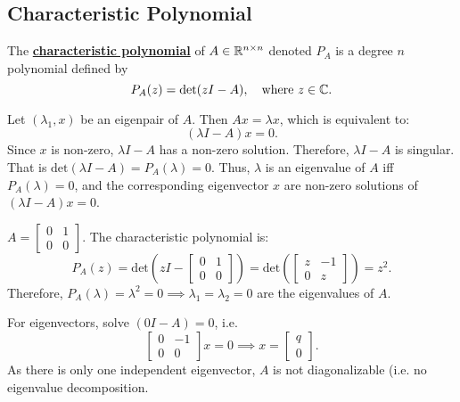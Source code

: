 \documentclass[../main/main.tex]{subfiles}
\begin{document}
\subsection{Characteristic Polynomial}
\begin{definition}
	The \underline{\textbf{characteristic polynomial}} of $A\in \mathbb{R}^{n\times n}$ denoted $P_A$ is a degree $n$ polynomial defined by \[
		P_A(z)=\text{det}(zI-A),\quad \text{where }z\in\mathbb{C}
	.\] 
\end{definition}
Let $\left( \lambda_1,x \right) $ be an eigenpair of $A$. Then $Ax=\lambda x$, which is equivalent to: \[
	\left( \lambda I-A \right) x=0
.\] 
Since $x$ is non-zero, $\lambda I-A$ has a non-zero solution. Therefore,  $\lambda I-A$ is singular. That is $\text{det}(\lambda I-A)=P_A(\lambda)=0$. Thus, $\lambda$ is an eigenvalue of $A$ iff $P_A(\lambda)=0$, and the corresponding eigenvector  $x$ are non-zero solutions of $\left( \lambda I-A \right) x=0$.
\begin{example}
	$A=\begin{bmatrix} 0&1\\0 &0 \end{bmatrix} $. The characteristic polynomial is: \[
		P_A(z)=\text{det}\left(zI-\begin{bmatrix} 0&1\\0&0 \end{bmatrix} \right)=\text{det}\left( \begin{bmatrix} z&-1\\0&z \end{bmatrix}  \right) =z^2
	.\] Therefore, $P_A(\lambda)=\lambda^2=0\implies \lambda_1=\lambda_2=0$ are the eigenvalues of $A$.
	
	For eigenvectors, solve $(0I-A)=0$, i.e. \[
	\begin{bmatrix} 0&-1\\0&0 \end{bmatrix} x=0\implies x=\begin{bmatrix} q\\0 \end{bmatrix} 
.\] As there is only one independent eigenvector, $A$ is not diagonalizable (i.e. no eigenvalue decomposition.
\end{example}
\end{document}
